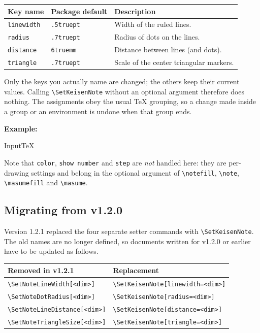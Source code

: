 \documentclass[luatex,fontsize=8pt,paper=b5,twoside]{jlreq}%
\begin{document}
\bigskip
\begin{center}
  \begin{tabular}{l l p{.5\linewidth}}
    \toprule
    Key name & Package default & Description \\
    \midrule
    \texttt{linewidth} & \texttt{.5truept} & Width of the ruled lines. \\
    \texttt{radius}    & \texttt{.7truept} & Radius of dots on the lines. \\
    \texttt{distance}  & \texttt{6truemm} & Distance between lines (and dots). \\
    \texttt{triangle}  & \texttt{.7truept} & Scale of the center triangular markers. \\
    \bottomrule
  \end{tabular}
\end{center}
\bigskip

Only the keys you actually name are changed; the others keep their current values.
Calling \texttt{\textbackslash SetKeisenNote} without an optional argument therefore
does nothing. The assignments obey the usual \TeX{} grouping, so a change made
inside a group or an environment is undone when that group ends.

\bigskip
\textbf{Example:}
\begin{SourceCode}{Input}{TeX}
  \SetKeisenNote[distance=10mm, linewidth=1pt]
\end{SourceCode}
{\SetKeisenNote[distance=10mm, linewidth=1pt]}

\bigskip
Note that \texttt{color}, \texttt{show number} and \texttt{step} are \emph{not}
handled here: they are per-drawing settings and belong in the optional argument of
\texttt{\textbackslash notefill}, \texttt{\textbackslash note},
\texttt{\textbackslash masumefill} and \texttt{\textbackslash masume}.

\subsection{Migrating from v1.2.0}
Version 1.2.1 replaced the four separate setter commands with
\texttt{\textbackslash SetKeisenNote}. The old names are no longer defined, so
documents written for v1.2.0 or earlier have to be updated as follows.

\bigskip
\begin{center}
  \begin{tabular}{l l}
    \toprule
    Removed in v1.2.1 & Replacement \\
    \midrule
    \texttt{\textbackslash SetNoteLineWidth[<dim>]}    & \texttt{\textbackslash SetKeisenNote[linewidth=<dim>]} \\
    \texttt{\textbackslash SetNoteDotRadius[<dim>]}    & \texttt{\textbackslash SetKeisenNote[radius=<dim>]} \\
    \texttt{\textbackslash SetNoteLineDistance[<dim>]} & \texttt{\textbackslash SetKeisenNote[distance=<dim>]} \\
    \texttt{\textbackslash SetNoteTriangleSize[<dim>]} & \texttt{\textbackslash SetKeisenNote[triangle=<dim>]} \\
    \bottomrule
  \end{tabular}
\end{center}
\bigskip
\end{document}
